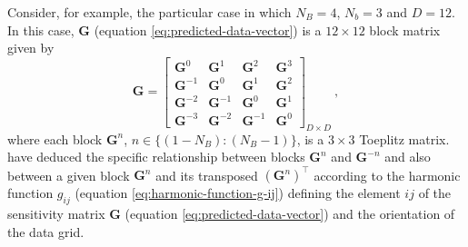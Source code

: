 \documentclass[utf8]{FrontiersinHarvard} %
\begin{document}
	Consider, for example, the particular case in which $N_{B} = 4$, $N_{b} = 3$ and $D = 12$. In this case,
	$\mathbf{G}$ (equation \ref{eq:predicted-data-vector}) is a $12 \times 12$ block matrix given by
	\begin{equation}
		\mathbf{G} = \begin{bmatrix}
			\mathbf{G}^{0} & \mathbf{G}^{1} & \mathbf{G}^{2} & \mathbf{G}^{3} \\
			\mathbf{G}^{-1} & \mathbf{G}^{0} & \mathbf{G}^{1} & \mathbf{G}^{2} \\
			\mathbf{G}^{-2} & \mathbf{G}^{-1} & \mathbf{G}^{0} & \mathbf{G}^{1} \\
			\mathbf{G}^{-3} & \mathbf{G}^{-2} & \mathbf{G}^{-1} & \mathbf{G}^{0}
		\end{bmatrix}_{D \times D} \: ,
		\label{eq:matrix-G-BTTB}
	\end{equation}
	where each block $\mathbf{G}^{n}$, $n \in \{ (1 - N_{B}) : (N_{B} - 1) \}$, is a $3 \times 3$ Toeplitz matrix.
	\citet{takahashi-etal2020, takahashi-etal2022} have deduced the specific relationship between blocks $\mathbf{G}^{n}$
	and $\mathbf{G}^{-n}$ and also between a given block $\mathbf{G}^{n}$ and its transposed $\left(\mathbf{G}^{n}\right)^{\top}$
	according to the harmonic function $g_{ij}$ (equation \ref{eq:harmonic-function-g-ij}) defining the element $ij$ of
	the sensitivity matrix $\mathbf{G}$ (equation \ref{eq:predicted-data-vector}) and the orientation of the data grid.
	
\end{document}
